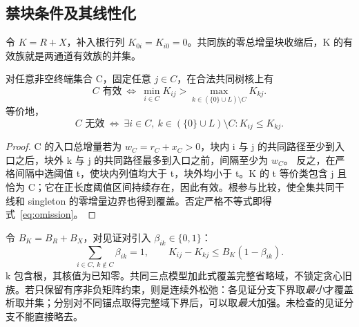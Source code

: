\subsection{禁块条件及其线性化}
令 $K=R+X$，补入根行列 $K_{0i}=K_{i0}=0$。共同族的零总增量块收缩后，K 的有效族就是两通道有效族的并集。
\begin{theorem}[列分层与块不存在]
对任意非空终端集合 C，固定任意 $j\in C$，在合法共同树核上有
\begin{equation}
 C\text{ 有效}\ \Longleftrightarrow\
 \min_{i\in C}K_{ij}>\max_{k\in(\{0\}\cup L)\setminus C}K_{kj}.
 \label{eq:clade}
\end{equation}
等价地，
\begin{equation}
 C\text{ 无效}\ \Longleftrightarrow\
 \exists i\in C,\ k\in(\{0\}\cup L)\setminus C:
 K_{ij}\le K_{kj}.
 \label{eq:omission}
\end{equation}
\end{theorem}
\begin{proof}
C 的入口总增量若为 $w_C=r_C+x_C>0$，块内 i 与 j 的共同路径至少到入口之后，块外 k 与 j 的共同路径最多到入口之前，间隔至少为 $w_C$。
反之，在严格间隔中选阈值 t，使块内列值均大于 t，块外均小于 t。K 的 t 等价类包含 j 且恰为 C；它在正长度阈值区间持续存在，因此有效。根参与比较，使全集共同干线和 singleton 的零增量边界也得到覆盖。否定严格不等式即得式~\eqref{eq:omission}。
\end{proof}
令 $B_K=B_R+B_X$，对见证对引入 $\beta_{ik}\in\{0,1\}$：
\begin{equation}
 \sum_{i\in C,\ k\notin C}\beta_{ik}=1,\qquad
 K_{ij}-K_{kj}\le B_K(1-\beta_{ik}).
 \label{eq:omitmip}
\end{equation}
k 包含根，其核值为已知零。共同三点模型加此式覆盖完整省略域，不锁定贪心旧族。若只保留有序非负矩阵约束，则是连续外松弛：各见证分支下界取\emph{最小}才覆盖析取并集；分别对不同锚点取得完整域下界后，可以取\emph{最大}加强。未检查的见证分支不能直接略去。

